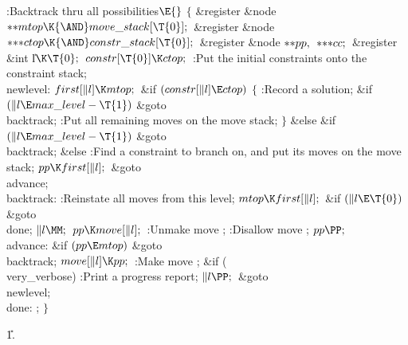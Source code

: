 \Y\B\4:Backtrack thru all possibilities\X${}\E{}$\6
${}\{{}$\1\6
\&{register} \&{node} ${}{*}{*}\\{mtop}\K{\AND}\\{move\_stack}[\T{0}];{}$\6
\&{register} \&{node} ${}{*}{*}{*}\\{ctop}\K{\AND}\\{constr\_stack}[\T{0}];{}$\6
\&{register} \&{node} ${}{*}{*}\\{pp},{}$ ${}{*}{*}{*}\\{cc};{}$\6
\&{register} \&{int} \|l${}\K\T{0};{}$\7
${}\\{constr}[\T{0}]\K\\{ctop};{}$\6
:Put the initial constraints onto the constraint stack\X;\6
\4\\{newlevel}:\5
${}\\{first}[\|l]\K\\{mtop};{}$\6
\&{if} ${}(\\{constr}[\|l]\E\\{ctop}){}$\5
${}\{{}$\1\6
:Record a solution\X;\6
\&{if} ${}(\|l\E\\{max\_level}-\T{1}){}$\1\5
\&{goto} \\{backtrack};\2\6
:Put all remaining moves on the move stack\X;\6
\4${}\}{}$\2\6
\&{else} \&{if} ${}(\|l\E\\{max\_level}-\T{1}){}$\1\5
\&{goto} \\{backtrack};\2\6
\&{else}\1\5
:Find a constraint to branch on, and put its moves on the move stack\X;\2\6
${}\\{pp}\K\\{first}[\|l];{}$\6
\&{goto} \\{advance};\6
\4\\{backtrack}:\5
:Reinstate all moves from this level\X;\6
${}\\{mtop}\K\\{first}[\|l];{}$\6
\&{if} ${}(\|l\E\T{0}){}$\1\5
\&{goto} \\{done};\2\6
${}\|l\MM;{}$\6
${}\\{pp}\K\\{move}[\|l];{}$\6
:Unmake move \X;\6
:Disallow move \X;\6
${}\\{pp}\PP;{}$\6
\4\\{advance}:\6
\&{if} ${}(\\{pp}\E\\{mtop}){}$\1\5
\&{goto} \\{backtrack};\2\6
${}\\{move}[\|l]\K\\{pp};{}$\6
:Make move \X;\6
\&{if} (\\{very\_verbose})\1\5
:Print a progress report\X;\2\6
${}\|l\PP;{}$\6
\&{goto} \\{newlevel};\6
\4\\{done}:\5
;\6
\4${}\}{}$\2\par
\U1.\fi

